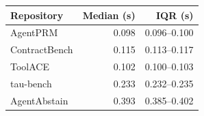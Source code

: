 \begin{nonfloatingtable}
\centering
\begin{tabular}{@{}lrr@{}}
\toprule Repository & Median (s) & IQR (s) \\\midrule
AgentPRM & 0.098 & 0.096--0.100 \\
ContractBench & 0.115 & 0.113--0.117 \\
ToolACE & 0.102 & 0.100--0.103 \\
tau-bench & 0.233 & 0.232--0.235 \\
AgentAbstain & 0.393 & 0.385--0.402 \\
\bottomrule\end{tabular}
\caption{Execution time of the original contract invocations, including process startup and reading saved summaries. Median and interquartile range from seven runs per repository on an Apple Silicon CPU. Data acquisition, conversion, and the full ToolACE scan are outside these timings.}
\label{tab:runtime}
\end{nonfloatingtable}
